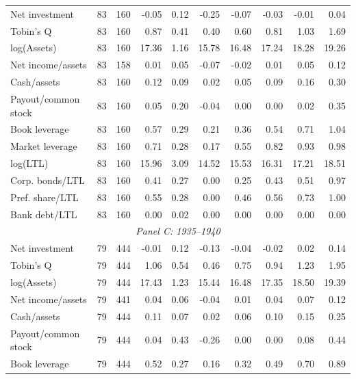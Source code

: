 \begin{table}[p]
\begin{threeparttable}
\begin{tabular}{lrrrrrrrrr}
            \midrule
            Net investment & 83 & 160 & -0.05 & 0.12 & -0.25 & -0.07 & -0.03 & -0.01 & 0.04 \\
            Tobin's Q & 83 & 160 & 0.87 & 0.41 & 0.40 & 0.60 & 0.81 & 1.03 & 1.69 \\
            log(Assets) & 83 & 160 & 17.36 & 1.16 & 15.78 & 16.48 & 17.24 & 18.28 & 19.26 \\
            Net income/assets & 83 & 158 & 0.01 & 0.05 & -0.07 & -0.02 & 0.01 & 0.05 & 0.12 \\
            Cash/assets & 83 & 160 & 0.12 & 0.09 & 0.02 & 0.05 & 0.09 & 0.16 & 0.30 \\
            Payout/common stock & 83 & 160 & 0.05 & 0.20 & -0.04 & 0.00 & 0.00 & 0.02 & 0.35 \\
            Book leverage & 83 & 160 & 0.57 & 0.29 & 0.21 & 0.36 & 0.54 & 0.71 & 1.04 \\
            Market leverage & 83 & 160 & 0.71 & 0.28 & 0.17 & 0.55 & 0.82 & 0.93 & 0.98 \\
            log(LTL) & 83 & 160 & 15.96 & 3.09 & 14.52 & 15.53 & 16.31 & 17.21 & 18.51 \\
            Corp. bonds/LTL & 83 & 160 & 0.41 & 0.27 & 0.00 & 0.25 & 0.43 & 0.51 & 0.97 \\
            Pref. share/LTL & 83 & 160 & 0.55 & 0.28 & 0.00 & 0.46 & 0.56 & 0.73 & 1.00 \\
            Bank debt/LTL & 83 & 160 & 0.00 & 0.02 & 0.00 & 0.00 & 0.00 & 0.00 & 0.00 \\
            \midrule
            \multicolumn{10}{c}{\textit{Panel C: 1935--1940}} \\
            \midrule
            Net investment & 79 & 444 & -0.01 & 0.12 & -0.13 & -0.04 & -0.02 & 0.02 & 0.14 \\
            Tobin's Q & 79 & 444 & 1.06 & 0.54 & 0.46 & 0.75 & 0.94 & 1.23 & 1.95 \\
            log(Assets) & 79 & 444 & 17.43 & 1.23 & 15.44 & 16.48 & 17.35 & 18.50 & 19.39 \\
            Net income/assets & 79 & 441 & 0.04 & 0.06 & -0.04 & 0.01 & 0.04 & 0.07 & 0.12 \\
            Cash/assets & 79 & 444 & 0.11 & 0.07 & 0.02 & 0.06 & 0.10 & 0.15 & 0.25 \\
            Payout/common stock & 79 & 444 & 0.04 & 0.43 & -0.26 & 0.00 & 0.00 & 0.08 & 0.44 \\
            Book leverage & 79 & 444 & 0.52 & 0.27 & 0.16 & 0.32 & 0.49 & 0.70 & 0.89 \\

\end{tabular}
\end{threeparttable}
\end{table}
